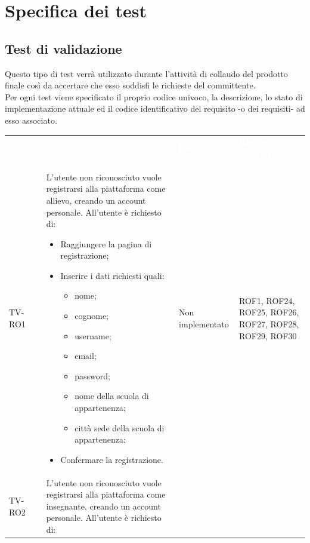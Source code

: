 \appendix
\section{Specifica dei test}
\subsection{Test di validazione}
Questo tipo di test verrà utilizzato durante l'attività di collaudo del prodotto finale così da accertare che esso soddisfi le richieste del committente. \\
Per ogni test viene specificato il proprio codice univoco, la descrizione, lo stato di implementazione attuale ed il codice identificativo del requisito -o dei requisiti- ad esso associato. 

	\begin{longtable}{|>{\centering\arraybackslash}m{1.6cm}|>{\centering\arraybackslash}m{6.41cm}|>{\centering\arraybackslash}m{3.1cm} | >{\centering\arraybackslash}m{2.6cm}|}		
		\rowcolor{LightBlue}
		\textbf{\textcolor{white}{Codice}}
		& \multicolumn{1}{|c|}{\textbf{\textcolor{white}{ Descrizione}}}
		& \textbf{\textcolor{white}{Esito}} & \textbf{\textcolor{white}{Requisito associato}}\\
		TV-RO1 & L'utente non riconosciuto vuole registrarsi alla piattaforma come allievo, creando un account personale. All'utente è richiesto di:
		\begin{itemize}
			\item Raggiungere la pagina di registrazione;
			\item Inserire i dati richiesti quali:
				\begin{itemize}
				 	\item nome;
				 	\item cognome;
				 	\item username;
				 	\item email;
				 	\item password;
				 	\item nome della scuola di appartenenza;
				 	\item città sede della scuola di appartenenza;
				\end{itemize}
			\item Confermare la registrazione.
		\end{itemize} & Non implementato & ROF1, ROF24, ROF25, ROF26, ROF27, ROF28, ROF29, ROF30 \\ \hline
		\rowcolor{LightGray}
		TV-RO2 & L'utente non riconosciuto vuole registrarsi alla piattaforma come insegnante, creando un account personale. All'utente è richiesto di:

\end{longtable}
